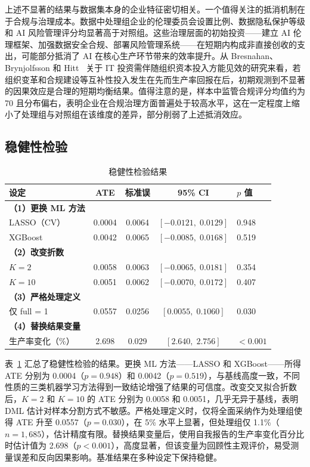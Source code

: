 \documentclass[UTF8,11pt,a4paper]{ctexart}
\begin{document}
上述不显著的结果与数据集本身的企业特征密切相关。一个值得关注的抵消机制在于合规与治理成本。数据中处理组企业的伦理委员会设置比例、数据隐私保护等级和 AI 风险管理评分均显著高于对照组。这些治理层面的初始投资——建立 AI 伦理框架、加强数据安全合规、部署风险管理系统——在短期内构成非直接创收的支出，可能部分抵消了 AI 在核心生产环节带来的效率提升。从 Bresnahan、Brynjolfsson 和 Hitt~\cite{bresnahan2002information} 关于 IT 投资需伴随组织资本投入方能见效的研究来看，若组织变革和合规建设等互补性投入发生在先而生产率回报在后，初期观测到不显著的因果效应是合理的短期均衡结果。值得注意的是，样本中监管合规评分均值约为 70 且分布偏右，表明企业在合规治理方面普遍处于较高水平，这在一定程度上缩小了处理组与对照组在该维度的差异，部分削弱了上述抵消效应。

\subsection{稳健性检验}

\begin{table}[H]
\centering
\caption{稳健性检验结果}
\label{tab:robustness}
\small
\setlength{\tabcolsep}{4pt}
\begin{tabular}{lcccl}
\toprule
设定 & ATE & 标准误 & 95\% CI & $p$ 值 \\
\midrule
\textbf{（1）更换 ML 方法} & & & & \\
\quad LASSO（CV） & 0.0004 & 0.0064 & $[-0.0121,\;0.0129]$ & 0.948 \\
\quad XGBoost & 0.0042 & 0.0065 & $[-0.0085,\;0.0168]$ & 0.519 \\
\midrule
\textbf{（2）改变折数} & & & & \\
\quad $K = 2$ & 0.0058 & 0.0063 & $[-0.0065,\;0.0181]$ & 0.354 \\
\quad $K = 10$ & 0.0051 & 0.0062 & $[-0.0070,\;0.0172]$ & 0.407 \\
\midrule
\textbf{（3）严格处理定义} & & & & \\
\quad 仅 full = 1 & 0.0557 & 0.0256 & $[0.0055,\;0.1060]$ & 0.030 \\
\midrule
\textbf{（4）替换结果变量} & & & & \\
\quad 生产率变化（\%） & 2.698 & 0.029 & $[2.640,\;2.756]$ & $<0.001$ \\
\bottomrule
\end{tabular}
\end{table}

表~\ref{tab:robustness} 汇总了稳健性检验的结果。更换 ML 方法——LASSO 和 XGBoost——所得 ATE 分别为 0.0004（$p = 0.948$）和 0.0042（$p = 0.519$），与基线高度一致，不同性质的三类机器学习方法得到一致结论增强了结果的可信度。改变交叉拟合折数后，$K = 2$ 和 $K = 10$ 的 ATE 分别为 0.0058 和 0.0051，几乎无异于基线，表明 DML 估计对样本分割方式不敏感。严格处理定义时，仅将全面采纳作为处理组使得 ATE 升至 0.0557（$p = 0.030$），在 5\% 水平上显著，但处理组仅 1.1\%（$n = 1{,}685$），估计精度有限。替换结果变量后，使用自我报告的生产率变化百分比时估计值为 2.698（$p < 0.001$），高度显著，但该变量为回顾性主观评价，易受测量误差和反向因果影响。基准结果在多种设定下保持稳健。
\end{document}
